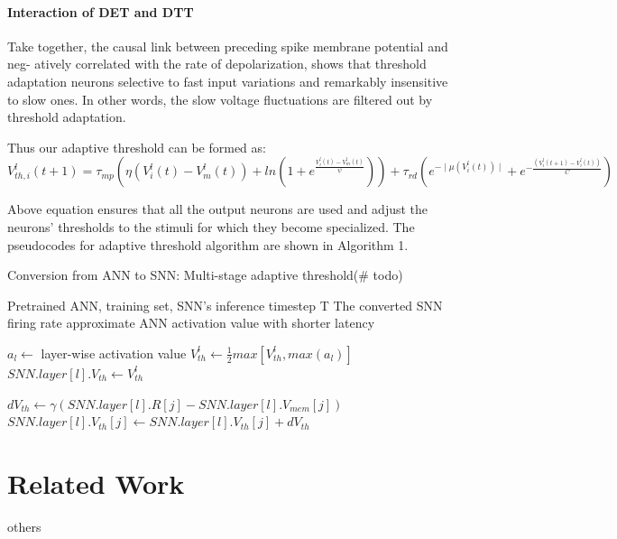\documentclass{article}
\begin{document}
\paragraph{Interaction of DET and DTT} Take together, the causal link between preceding spike membrane potential and neg-
atively correlated with the rate of depolarization, shows that threshold adaptation neurons selective to fast input variations and remarkably insensitive to slow ones. In other words, the slow voltage fluctuations are filtered out by threshold adaptation.

Thus our adaptive threshold can be formed as:
\begin{equation}
  V_{th,i}^l(t+1) = \tau_{mp}\left(\eta\left(V_i^l(t)-V_m^l(t)\right)+ln\left(1+e^{\frac{V_i^l(t)-V_m^l(t)}{\psi}}\right)\right) + \tau_{rd}\left(e^{-\mid\mu\left(V_i^l(t)\right)\mid} + e^{-\frac{\left(V_i^l(t+1)-V_i^l(t)\right)}{C}}\right)
\end{equation}

Above equation ensures that all the output neurons are used and adjust the neurons’ thresholds to the
stimuli for which they become specialized.
The pseudocodes for adaptive threshold algorithm are shown in Algorithm 1.
\begin{algorithm}[h] 
	\caption{Conversion from ANN to SNN: Multi-stage adaptive threshold(\# todo)} 
	\begin{algorithmic}[1] 
		\Require 
    Pretrained ANN, training set,  SNN's inference timestep T
		\Ensure 
		The converted SNN firing rate approximate ANN activation value with shorter latency

      \State $a_l \gets$ layer-wise activation value
        \State $V_{th}^l \gets \frac{1}{2}max[V_{th}^l, max(a_l)]$
        \State $SNN.layer[l].V_{th} \gets V_{th}^l$
      \EndFor
    \EndFor

          \State $dV_{th} \gets \gamma(SNN.layer[l].R[j] - SNN.layer[l].V_{mem}[j])$
          \State $SNN.layer[l].V_{th}[j] \gets SNN.layer[l].V_{th}[j] + dV_{th}$
        \EndFor
      \EndFor
    \EndFor

	\end{algorithmic} 
\end{algorithm}


\section{Related Work}
others
\end{document}
